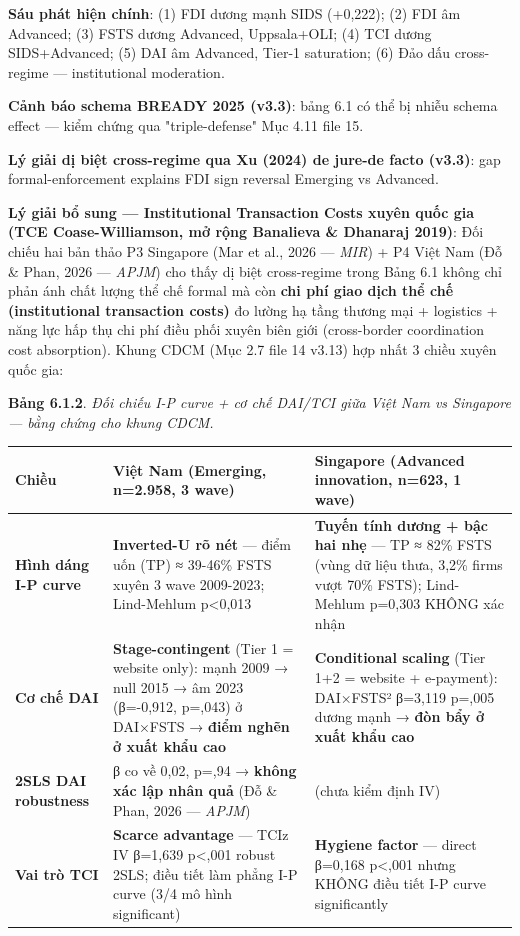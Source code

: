 \documentclass[12pt,a4paper]{article}
\begin{document}
\textbf{Sáu phát hiện chính}: (1) FDI dương mạnh SIDS (+0,222); (2) FDI
âm Advanced; (3) FSTS dương Advanced, Uppsala+OLI; (4) TCI dương
SIDS+Advanced; (5) DAI âm Advanced, Tier-1 saturation; (6) Đảo dấu
cross-regime --- institutional moderation.

\textbf{Cảnh báo schema BREADY 2025 (v3.3)}: bảng 6.1 có thể bị nhiễu
schema effect --- kiểm chứng qua "triple-defense" Mục 4.11 file 15.

\textbf{Lý giải dị biệt cross-regime qua Xu (2024) de jure-de facto
(v3.3)}: gap formal-enforcement explains FDI sign reversal Emerging vs
Advanced.

\textbf{Lý giải bổ sung --- Institutional Transaction Costs xuyên quốc
gia (TCE Coase-Williamson, mở rộng Banalieva \& Dhanaraj 2019)}: Đối
chiếu hai bản thảo P3 Singapore (Mar et al., 2026 --- \emph{MIR}) + P4
Việt Nam (Đỗ \& Phan, 2026 --- \emph{APJM}) cho thấy dị biệt
cross-regime trong Bảng 6.1 không chỉ phản ánh chất lượng thể chế formal
mà còn \textbf{chi phí giao dịch thể chế (institutional transaction
costs)} đo lường hạ tầng thương mại + logistics + năng lực hấp thụ chi
phí điều phối xuyên biên giới (cross-border coordination cost
absorption). Khung CDCM (Mục 2.7 file 14 v3.13) hợp nhất 3 chiều xuyên
quốc gia:

\textbf{Bảng 6.1.2}. \emph{Đối chiếu I-P curve + cơ chế DAI/TCI giữa
Việt Nam vs Singapore --- bằng chứng cho khung CDCM.}

\begin{longtable}[]{@{}lll@{}}
\toprule\noalign{}
Chiều & \textbf{Việt Nam (Emerging, n=2.958, 3 wave)} &
\textbf{Singapore (Advanced innovation, n=623, 1 wave)} \\
\midrule\noalign{}
\endhead
\bottomrule\noalign{}
\endlastfoot
\textbf{Hình dáng I-P curve} & \textbf{Inverted-U rõ nét} --- điểm uốn
(TP) ≈ 39-46\% FSTS xuyên 3 wave 2009-2023; Lind-Mehlum p\textless0,013
& \textbf{Tuyến tính dương + bậc hai nhẹ} --- TP ≈ 82\% FSTS (vùng dữ
liệu thưa, 3,2\% firms vượt 70\% FSTS); Lind-Mehlum p=0,303 KHÔNG xác
nhận \\
\textbf{Cơ chế DAI} & \textbf{Stage-contingent} (Tier 1 = website only):
mạnh 2009 → null 2015 → âm 2023 (β=-0,912, p=,043) ở DAI×FSTS →
\textbf{điểm nghẽn ở xuất khẩu cao} & \textbf{Conditional scaling} (Tier
1+2 = website + e-payment): DAI×FSTS² β=3,119 p=,005 dương mạnh →
\textbf{đòn bẩy ở xuất khẩu cao} \\
\textbf{2SLS DAI robustness} & β co về 0,02, p=,94 → \textbf{không xác
lập nhân quả} (Đỗ \& Phan, 2026 --- \emph{APJM}) & (chưa kiểm định
IV) \\
\textbf{Vai trò TCI} & \textbf{Scarce advantage} --- TCIz IV β=1,639
p\textless,001 robust 2SLS; điều tiết làm phẳng I-P curve (3/4 mô hình
significant) & \textbf{Hygiene factor} --- direct β=0,168 p\textless,001
nhưng KHÔNG điều tiết I-P curve significantly \\
\end{longtable}
\end{document}
